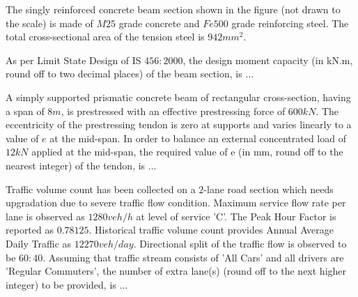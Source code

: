     \item The singly reinforced concrete beam section shown in the figure (not drawn to the scale) is made of $M25$ grade concrete and $Fe500$ grade reinforcing steel. The total cross-sectional area of the tension steel is $942 mm^2$.
    \begin{figure}[H]
\centering
{}%

\label{fig:my_label}
\end{figure}
    As per Limit State Design of IS $456:2000$, the design moment capacity (in kN.m, round off to two decimal places) of the beam section, is $\dots$

    \item A simply supported prismatic concrete beam of rectangular cross-section, having a span of $8 m$, is prestressed with an effective prestressing force of $600 kN$. The eccentricity of the prestressing tendon is zero at supports and varies linearly to a value of $e$ at the mid-span. In order to balance an external concentrated load of $12 kN$ applied at the mid-span, the required value of e (in mm, round off to the nearest integer) of the tendon, is $\dots$

    \item Traffic volume count has been collected on a $2$-lane road section which needs upgradation due to severe traffic flow condition. Maximum service flow rate per lane is observed as $1280 veh/h$ at level of service 'C'. The Peak Hour Factor is reported as $0.78125$. Historical traffic volume count provides Annual Average Daily Traffic as $12270 veh/day$. Directional split of the traffic flow is observed to be $60:40$. Assuming that traffic stream consists of 'All Cars' and all drivers are 'Regular Commuters', the number of extra lane(s) (round off to the next higher integer) to be provided, is $\dots$

